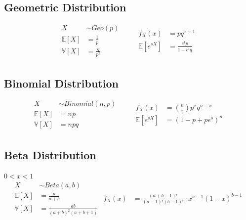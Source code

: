 \documentclass[12pt]{article}
\begin{document}
\subsection{Geometric Distribution}
\begin{equation*}
    \begin{aligned}
        X &\sim Geo(p) \qquad\\
        \mathbb{E}[X] &= \frac{1}{p} \\
        \mathbb{V}[X] &= \frac{q}{p^2} \\
    \end{aligned}
    \begin{aligned}
        f_X(x) &= pq^{x-1}              \\
        \mathbb{E}[e^{sX}] &= \frac{e^tp}{1 - e^tq} \\
    \end{aligned}
\end{equation*}

\subsection{Binomial Distribution}
\begin{equation*}
    \begin{aligned}
        X &\sim Binomial(n, p) \qquad\\
        \mathbb{E}[X] &= np \\
        \mathbb{V}[X] &= npq \\
    \end{aligned}
    \begin{aligned}
        f_X(x) &= \binom{n}{x} p^x q^{n-x} \\
        \mathbb{E}[e^{sX}] &= (1 - p + pe^s)^n \\
    \end{aligned}
\end{equation*}

\subsection{Beta Distribution}
\(0 < x < 1\)
\begin{equation*}
    \begin{aligned}
        X &\sim Beta(a, b) \qquad\\
        \mathbb{E}[X] &= \frac{a}{a + b} \\
        \mathbb{V}[X] &= \frac{ab}{(a + b)^2(a + b + 1)}\\
    \end{aligned}
    \begin{aligned}
        f_X(x) &= \frac{(a + b - 1)!}{(a - 1)! (b - 1)!} \cdot x^{a-1} (1 - x)^{b-1} \\
    \end{aligned}
\end{equation*}
\end{document}
